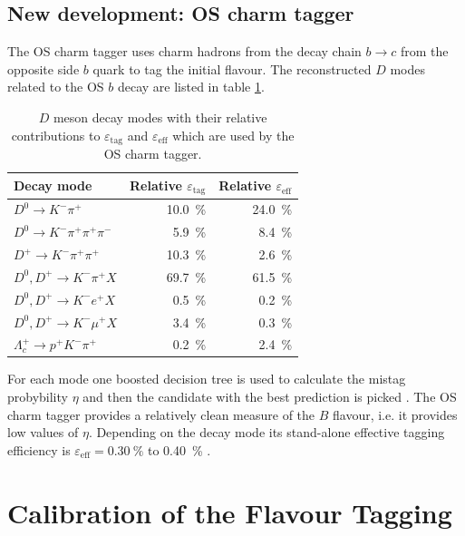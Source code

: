 \documentclass{PoS}
\begin{document}
\subsection{New development: OS charm tagger}

The OS charm tagger uses charm hadrons from the decay chain $b\to c$ from the opposite side $b$ quark to tag the initial flavour. The reconstructed $D$ modes related to the OS $b$ decay are listed in table \ref{tab:OScharm}.
\begin{table}[htbp]
  \centering
  \begin{tabular}{lrr}
  \toprule
  Decay mode &Relative $\varepsilon_\text{tag}$ & Relative $\varepsilon_\text{eff}$ \\
  \midrule
  $D^0\to K^-\pi^+$ & \SI{10.0}{\%} & \SI{24.0}{\%} \\ 
  $D^0\to K^-\pi^+\pi^+\pi^-$ & \SI{5.9}{\%} & \SI{8.4}{\%} \\
  $D^+\to K^-\pi^+\pi^+$ & \SI{10.3}{\%} & \SI{2.6}{\%} \\
  $D^0,D^+\to K^-\pi^+X$ & \SI{69.7}{\%} & \SI{61.5}{\%} \\
  $D^0,D^+\to K^-e^+X$ & \SI{0.5}{\%} & \SI{0.2}{\%} \\
  $D^0,D^+\to K^-\mu^+X$ & \SI{3.4}{\%} & \SI{0.3}{\%} \\
  $\Lambda_c^+\to p^+K^-\pi^+$ & \SI{0.2}{\%} & \SI{2.4}{\%} \\
  \bottomrule
  \end{tabular}
  \small{\caption{$D$ meson decay modes with their relative contributions to $\varepsilon_\text{tag}$ and $\varepsilon_\text{eff}$ which are used by the OS charm tagger.}}
  \label{tab:OScharm}
\end{table}
For each mode one boosted decision tree is used to calculate the mistag probybility $\eta$ and then the candidate with the best prediction is picked \cite{12}. The OS charm tagger provides a relatively clean measure of the $B$ flavour, i.e. it provides low values of $\eta$. Depending on the decay mode its stand-alone effective tagging efficiency is $\varepsilon_\text{eff}=\SI{0.30}{\%}$ to \SI{0.40}{\%} \cite{12}.

\section{Calibration of the Flavour Tagging}\label{sec:3}
\end{document}
